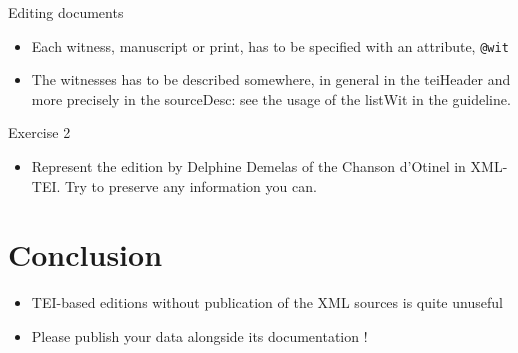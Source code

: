 \documentclass[11pt,aspectratio=1610]{beamer}
\begin{document}
\begin{frame}{Editing documents}
\begin{itemize}
\item Each witness, manuscript or print, has to be specified with an attribute, \texttt{@wit}
\item The witnesses has to be described somewhere, in general in the teiHeader and more precisely in the sourceDesc: see the usage of the listWit in the guideline.
\end{itemize}
\end{frame}

\begin{frame}{Exercise 2}
\begin{itemize}
\item Represent the edition by Delphine Demelas of the Chanson d'Otinel in XML-TEI. Try to preserve any information you can.
\end{itemize}
\end{frame}








\section{Conclusion}
\begin{frame}{}
\begin{itemize}
\item TEI-based editions without publication of the XML sources is quite unuseful
\item Please publish your data alongside its documentation !
\end{itemize}
\end{frame}
\end{document}
